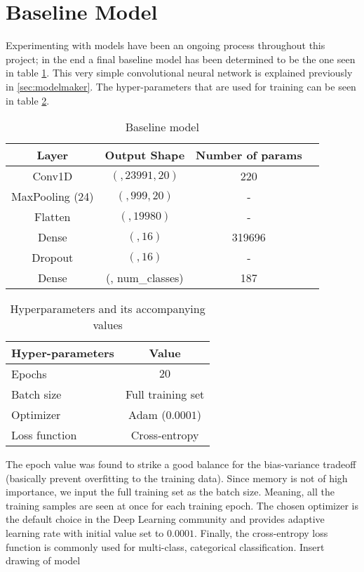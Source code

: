 \section{Baseline Model}
\label{sec:model}
Experimenting with models have been an ongoing process throughout this project; in the end a final baseline model has been determined to be the one seen in table \ref{tab:model}. This very simple convolutional neural network  is explained previously in \ref{sec:modelmaker}. The hyper-parameters that are used for training can be seen in table \ref{tab:hyperp}.
\begin{table}[H]
	\centering
	\begin{tabular}{|c|c|c| c|} \hline
		\textbf{Layer} & \textbf{Output Shape } & \textbf{Number of params} \\ \hline \hline 
		Conv1D & $(, 23991, 20)$  &  220  \\ \hline 
		MaxPooling (24) & $(, 999, 20)$  &  -  \\ \hline 
		Flatten & $(, 19980)$  &  -  \\ \hline 
		Dense & $(, 16)$  &  319696  \\ \hline 
		Dropout & $(, 16)$  &  -  \\ \hline 
		Dense & (, num\_classes)  &  187  \\ \hline 
	\end{tabular}
	\caption{Baseline model}
	\label{tab:model}
\end{table}

\begin{table}[H]
	\centering
	\begin{tabular}{|l|c|} \hline
		\textbf{Hyper-parameters} & \textbf{Value} \\ \hline \hline 
		Epochs  & $20$ \\ \hline 
		Batch size & Full training set  \\ \hline 
		Optimizer & Adam ($0.0001$)  \\ \hline 
		Loss function & Cross-entropy  \\ \hline 
	\end{tabular}
	\caption{Hyperparameters and its accompanying values}
	\label{tab:hyperp}
\end{table}
The epoch value was found to strike a good balance for the bias-variance tradeoff (basically prevent overfitting to the training data). Since memory is not of high importance, we input the full training set as the batch size. Meaning, all the training samples are seen at once for each training epoch. The chosen optimizer is the default choice in the Deep Learning community and provides adaptive learning rate with initial value set to $0.0001$. Finally, the cross-entropy loss function is commonly used for multi-class, categorical classification. Insert drawing of model\todo{}

